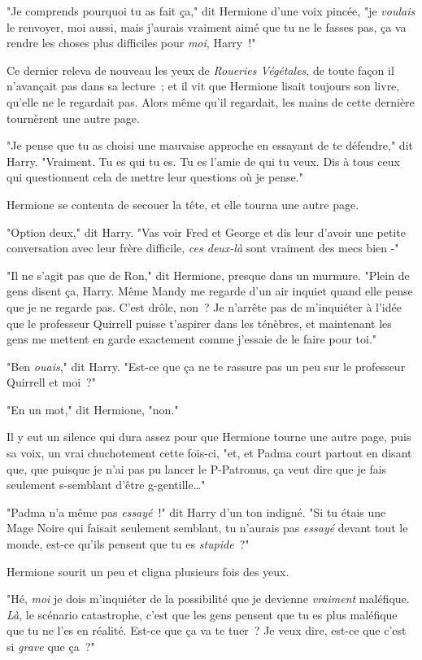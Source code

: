"Je comprends pourquoi tu as fait ça," dit Hermione d'une voix pincée, "je \emph{voulais} le renvoyer, moi aussi, mais j'aurais vraiment aimé que tu ne le fasses pas, ça va rendre les choses plus difficiles pour \emph{moi}, Harry~!"

Ce dernier releva de nouveau les yeux de \emph{Roueries Végétales}, de toute façon il n'avançait pas dans sa lecture~; et il vit que Hermione lisait toujours son livre, qu'elle ne le regardait pas. Alors même qu'il regardait, les mains de cette dernière tournèrent une autre page.

"Je pense que tu as choisi une mauvaise approche en essayant de te défendre," dit Harry. "Vraiment. Tu es qui tu es. Tu es l'amie de qui tu veux. Dis à tous ceux qui questionnent cela de mettre leur questions où je pense."

Hermione se contenta de secouer la tête, et elle tourna une autre page.

"Option deux," dit Harry. "Vas voir Fred et George et dis leur d'avoir une petite conversation avec leur frère difficile, \emph{ces deux-là} sont vraiment des mecs bien -"

"Il ne s'agit pas que de Ron," dit Hermione, presque dans un murmure. "Plein de gens disent ça, Harry. Même Mandy me regarde d'un air inquiet quand elle pense que je ne regarde pas. C'est drôle, non~? Je n'arrête pas de m'inquiéter à l'idée que le professeur Quirrell puisse t'aspirer dans les ténèbres, et maintenant les gens me mettent en garde exactement comme j'essaie de le faire pour toi."

"Ben \emph{ouais}," dit Harry. "Est-ce que ça ne te rassure pas un peu sur le professeur Quirrell et moi~?"

"En un mot," dit Hermione, "non."

Il y eut un silence qui dura assez pour que Hermione tourne une autre page, puis sa voix, un vrai chuchotement cette fois-ci, "et, et Padma court partout en disant que, que puisque je n'ai pas pu lancer le P-Patronus, ça veut dire que je fais seulement s-semblant d'être g-gentille…"

"Padma n'a même pas \emph{essayé}~!" dit Harry d'un ton indigné. "Si tu étais une Mage Noire qui faisait seulement semblant, tu n'aurais pas \emph{essayé} devant tout le monde, est-ce qu'ils pensent que tu es \emph{stupide}~?"

Hermione sourit un peu et cligna plusieurs fois des yeux.

"Hé, \emph{moi} je dois m'inquiéter de la possibilité que je devienne \emph{vraiment} maléfique. \emph{Là}, le scénario catastrophe, c'est que les gens pensent que tu es plus maléfique que tu ne l'es en réalité. Est-ce que ça va te tuer~? Je veux dire, est-ce que c'est si \emph{grave} que ça~?"

